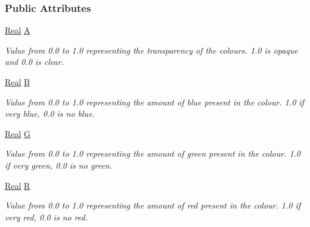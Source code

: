 \subsubsection*{Public Attributes}
\begin{DoxyCompactItemize}
\item 
\hypertarget{classMezzanine_1_1ColourValue_adb3001981a22ed063e57867add137b78}{
\hyperlink{namespaceMezzanine_a726731b1a7df72bf3583e4a97282c6f6}{Real} \hyperlink{classMezzanine_1_1ColourValue_adb3001981a22ed063e57867add137b78}{A}}
\label{classMezzanine_1_1ColourValue_adb3001981a22ed063e57867add137b78}

\begin{DoxyCompactList}\small\item\em Value from 0.0 to 1.0 representing the transparency of the colours. 1.0 is opaque and 0.0 is clear. \item\end{DoxyCompactList}\item 
\hypertarget{classMezzanine_1_1ColourValue_afade1a83b0a698395acf9d831327fa5c}{
\hyperlink{namespaceMezzanine_a726731b1a7df72bf3583e4a97282c6f6}{Real} \hyperlink{classMezzanine_1_1ColourValue_afade1a83b0a698395acf9d831327fa5c}{B}}
\label{classMezzanine_1_1ColourValue_afade1a83b0a698395acf9d831327fa5c}

\begin{DoxyCompactList}\small\item\em Value from 0.0 to 1.0 representing the amount of blue present in the colour. 1.0 if very blue, 0.0 is no blue. \item\end{DoxyCompactList}\item 
\hypertarget{classMezzanine_1_1ColourValue_a8991eb598d82e40a284d2d14717fa59b}{
\hyperlink{namespaceMezzanine_a726731b1a7df72bf3583e4a97282c6f6}{Real} \hyperlink{classMezzanine_1_1ColourValue_a8991eb598d82e40a284d2d14717fa59b}{G}}
\label{classMezzanine_1_1ColourValue_a8991eb598d82e40a284d2d14717fa59b}

\begin{DoxyCompactList}\small\item\em Value from 0.0 to 1.0 representing the amount of green present in the colour. 1.0 if very green, 0.0 is no green. \item\end{DoxyCompactList}\item 
\hypertarget{classMezzanine_1_1ColourValue_a81fc3a8ae319f7d273afbd45d35c7ae2}{
\hyperlink{namespaceMezzanine_a726731b1a7df72bf3583e4a97282c6f6}{Real} \hyperlink{classMezzanine_1_1ColourValue_a81fc3a8ae319f7d273afbd45d35c7ae2}{R}}
\label{classMezzanine_1_1ColourValue_a81fc3a8ae319f7d273afbd45d35c7ae2}

\begin{DoxyCompactList}\small\item\em Value from 0.0 to 1.0 representing the amount of red present in the colour. 1.0 if very red, 0.0 is no red. \item\end{DoxyCompactList}\end{DoxyCompactItemize}


